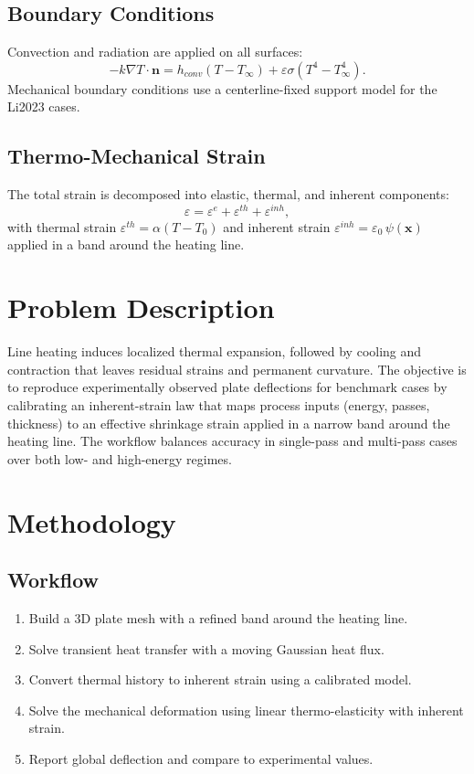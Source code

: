 \documentclass[11pt]{article}
\begin{document}
\subsection{Boundary Conditions}
Convection and radiation are applied on all surfaces:
\begin{equation}
- k \nabla T \cdot \mathbf{n} = h_{conv} (T - T_\infty) + \varepsilon \sigma (T^4 - T_\infty^4).
\end{equation}
Mechanical boundary conditions use a centerline-fixed support model for the Li2023 cases.

\subsection{Thermo-Mechanical Strain}
The total strain is decomposed into elastic, thermal, and inherent components:
\begin{equation}
\varepsilon = \varepsilon^e + \varepsilon^{th} + \varepsilon^{inh},
\end{equation}
with thermal strain $\varepsilon^{th} = \alpha (T - T_0)$ and inherent strain
$\varepsilon^{inh} = \varepsilon_0 \, \psi(\mathbf{x})$ applied in a band around the heating line.

\section{Problem Description}
Line heating induces localized thermal expansion, followed by cooling and contraction that leaves
residual strains and permanent curvature. The objective is to reproduce experimentally observed
plate deflections for benchmark cases by calibrating an inherent-strain law that maps process
inputs (energy, passes, thickness) to an effective shrinkage strain applied in a narrow band
around the heating line. The workflow balances accuracy in single-pass and multi-pass cases over
both low- and high-energy regimes.

\section{Methodology}
\subsection{Workflow}
\begin{enumerate}
  \item Build a 3D plate mesh with a refined band around the heating line.
  \item Solve transient heat transfer with a moving Gaussian heat flux.
  \item Convert thermal history to inherent strain using a calibrated model.
  \item Solve the mechanical deformation using linear thermo-elasticity with inherent strain.
  \item Report global deflection and compare to experimental values.
\end{enumerate}
\end{document}
